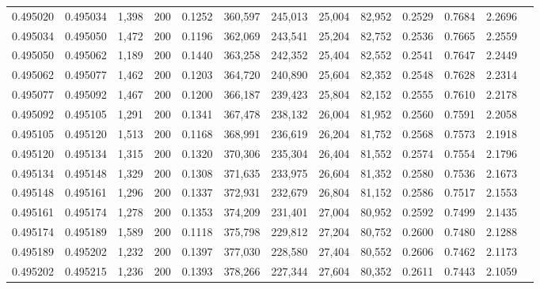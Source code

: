 \begin{tabular}{rrrrrrrrrrrrr}
0.495020 & 0.495034 &  1,398 & 200 &                                     0.1252 & 360,597 & 245,013 &  25,004 &  82,952 & 0.2529 & 0.7684 & 2.2696 \\
0.495034 & 0.495050 &  1,472 & 200 &                                     0.1196 & 362,069 & 243,541 &  25,204 &  82,752 & 0.2536 & 0.7665 & 2.2559 \\
0.495050 & 0.495062 &  1,189 & 200 &                                     0.1440 & 363,258 & 242,352 &  25,404 &  82,552 & 0.2541 & 0.7647 & 2.2449 \\
0.495062 & 0.495077 &  1,462 & 200 &                                     0.1203 & 364,720 & 240,890 &  25,604 &  82,352 & 0.2548 & 0.7628 & 2.2314 \\
0.495077 & 0.495092 &  1,467 & 200 &                                     0.1200 & 366,187 & 239,423 &  25,804 &  82,152 & 0.2555 & 0.7610 & 2.2178 \\
0.495092 & 0.495105 &  1,291 & 200 &                                     0.1341 & 367,478 & 238,132 &  26,004 &  81,952 & 0.2560 & 0.7591 & 2.2058 \\
0.495105 & 0.495120 &  1,513 & 200 &                                     0.1168 & 368,991 & 236,619 &  26,204 &  81,752 & 0.2568 & 0.7573 & 2.1918 \\
0.495120 & 0.495134 &  1,315 & 200 &                                     0.1320 & 370,306 & 235,304 &  26,404 &  81,552 & 0.2574 & 0.7554 & 2.1796 \\
0.495134 & 0.495148 &  1,329 & 200 &                                     0.1308 & 371,635 & 233,975 &  26,604 &  81,352 & 0.2580 & 0.7536 & 2.1673 \\
0.495148 & 0.495161 &  1,296 & 200 &                                     0.1337 & 372,931 & 232,679 &  26,804 &  81,152 & 0.2586 & 0.7517 & 2.1553 \\
0.495161 & 0.495174 &  1,278 & 200 &                                     0.1353 & 374,209 & 231,401 &  27,004 &  80,952 & 0.2592 & 0.7499 & 2.1435 \\
0.495174 & 0.495189 &  1,589 & 200 &                                     0.1118 & 375,798 & 229,812 &  27,204 &  80,752 & 0.2600 & 0.7480 & 2.1288 \\
0.495189 & 0.495202 &  1,232 & 200 &                                     0.1397 & 377,030 & 228,580 &  27,404 &  80,552 & 0.2606 & 0.7462 & 2.1173 \\
0.495202 & 0.495215 &  1,236 & 200 &                                     0.1393 & 378,266 & 227,344 &  27,604 &  80,352 & 0.2611 & 0.7443 & 2.1059 \\

\end{tabular}

